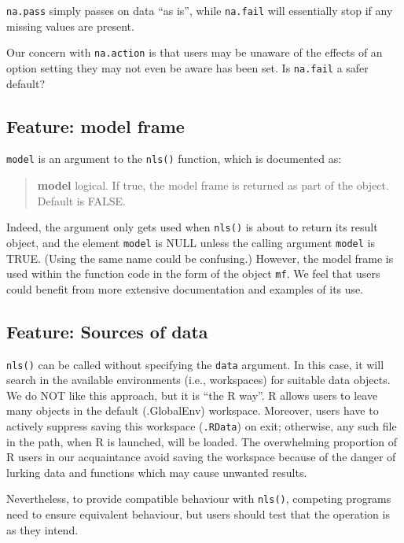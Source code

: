 \documentclass[
]{article}
\begin{document}
\texttt{na.pass} simply passes on data ``as is'', while \texttt{na.fail}
will essentially stop if any missing values are present.

Our concern with \texttt{na.action} is that users may be unaware of the
effects of an option setting they may not even be aware has been set. Is
\texttt{na.fail} a safer default?

\hypertarget{feature-model-frame}{%
\subsection{Feature: model frame}\label{feature-model-frame}}

\texttt{model} is an argument to the \texttt{nls()} function, which is
documented as:

\begin{quote}
\textbf{model} logical. If true, the model frame is returned as part of
the object. Default is FALSE.
\end{quote}

Indeed, the argument only gets used when \texttt{nls()} is about to
return its result object, and the element \texttt{model} is NULL unless
the calling argument \texttt{model} is TRUE. (Using the same name could
be confusing.) However, the model frame is used within the function code
in the form of the object \texttt{mf}. We feel that users could benefit
from more extensive documentation and examples of its use.

\hypertarget{feature-sources-of-data}{%
\subsection{Feature: Sources of data}\label{feature-sources-of-data}}

\texttt{nls()} can be called without specifying the \texttt{data}
argument. In this case, it will search in the available environments
(i.e., workspaces) for suitable data objects. We do NOT like this
approach, but it is ``the R way''. R allows users to leave many objects
in the default (.GlobalEnv) workspace. Moreover, users have to actively
suppress saving this workspace (\texttt{.RData}) on exit; otherwise, any
such file in the path, when R is launched, will be loaded. The
overwhelming proportion of R users in our acquaintance avoid saving the
workspace because of the danger of lurking data and functions which may
cause unwanted results.

Nevertheless, to provide compatible behaviour with \texttt{nls()},
competing programs need to ensure equivalent behaviour, but users should
test that the operation is as they intend.
\end{document}

